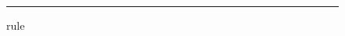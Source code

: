 \documentclass{memoir}
\begin{document}
\begin{figure}[t]\hrule height 1in\caption{rule}\end{figure}
\lipsum[1]\marginpar{\lipsum[1]}
\lipsum[2]\marginpar{\lipsum[2]}
\lipsum[3-4]
\end{document}
